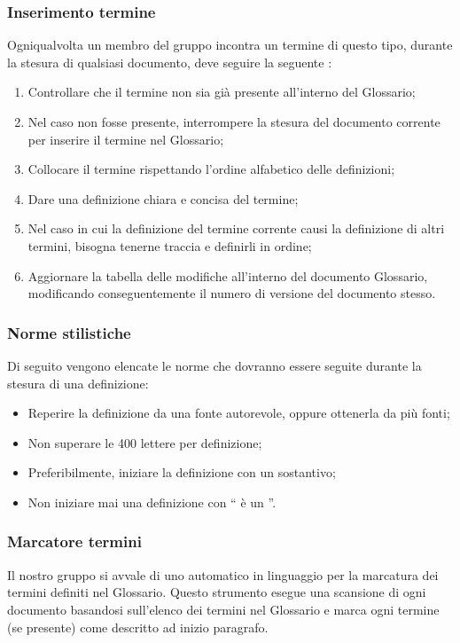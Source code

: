 \subsubsection{Inserimento termine}
\label{7.1}
Ogniqualvolta un membro del gruppo incontra un termine di questo tipo, durante la stesura di qualsiasi documento, deve seguire la seguente :
\begin{enumerate}
\item Controllare che il termine non sia già presente all'interno del Glossario;
\item Nel caso non fosse presente, interrompere la stesura del documento corrente per inserire il termine nel Glossario;
\item Collocare il termine rispettando l'ordine alfabetico delle definizioni;
\item Dare una definizione chiara e concisa del termine;
\item Nel caso in cui la definizione del termine corrente causi la definizione di altri termini, bisogna tenerne traccia e definirli in ordine;
\item Aggiornare la tabella delle modifiche all'interno del documento Glossario, modificando conseguentemente il numero di versione del documento stesso.
\end{enumerate}

\subsubsection{Norme stilistiche}
\label{7.2}
Di seguito vengono elencate le norme che dovranno essere seguite durante la stesura di una definizione:
\begin{itemize}
\item Reperire la definizione da una fonte autorevole, oppure ottenerla da più fonti;
\item Non superare le 400 lettere per definizione;
\item Preferibilmente, iniziare la definizione con un sostantivo;
\item Non iniziare mai una definizione con `` è un ''.
\end{itemize}

\subsubsection{Marcatore termini}
\label{7.3}
Il nostro gruppo si avvale di uno  automatico in linguaggio  per la marcatura dei termini definiti nel Glossario. Questo strumento esegue una scansione di ogni documento basandosi sull'elenco dei termini nel Glossario e marca ogni termine (se presente) come descritto ad inizio paragrafo.


